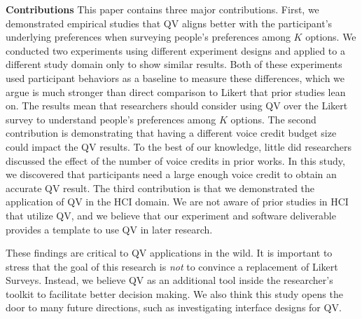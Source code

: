 \textbf{Contributions}
This paper contains three major contributions.
First, we demonstrated empirical studies that QV aligns better with the participant's underlying preferences when surveying people's preferences among $K$ options. We conducted two experiments using different experiment designs and applied to a different study domain only to show similar results. Both of these experiments used participant behaviors as a baseline to measure these differences, which we argue is much stronger than direct comparison to Likert that prior studies lean on. The results mean that researchers should consider using QV over the Likert survey to understand people's preferences among $K$ options. 
The second contribution is demonstrating that having a different voice credit budget size could impact the QV results. To the best of our knowledge, little did researchers discussed the effect of the number of voice credits in prior works. In this study, we discovered that participants need a large enough voice credit to obtain an accurate QV result.
The third contribution is that we demonstrated the application of QV in the HCI domain. We are not aware of prior studies in HCI that utilize QV, and we believe that our experiment and software deliverable provides a template to use QV in later research.

These findings are critical to QV applications in the wild. It is important to stress that the goal of this research is \textit{not} to convince a replacement of Likert Surveys. Instead, we believe QV as an additional tool inside the researcher's toolkit to facilitate better decision making. We also think this study opens the door to many future directions, such as investigating interface designs for QV.





